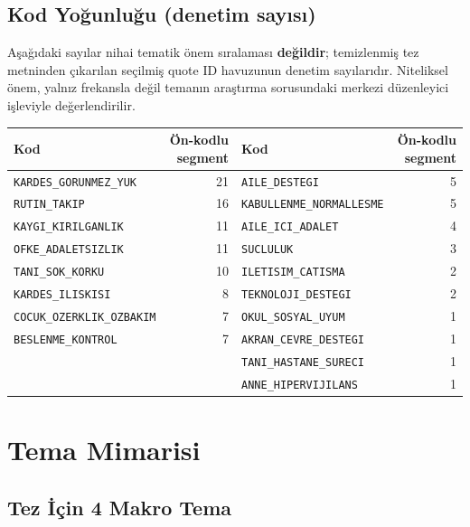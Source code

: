 \documentclass[
  turkish,
  a4paper,
  DIV=11,
  numbers=noendperiod]{scrreprt}
\newcounter{none} %
\begin{document}
\section{Kod Yoğunluğu (denetim
sayısı)}\label{kod-youx11funluux11fu-denetim-sayux131sux131}

Aşağıdaki sayılar nihai tematik önem sıralaması \textbf{değildir};
temizlenmiş tez metninden çıkarılan seçilmiş quote ID havuzunun denetim
sayılarıdır. Niteliksel önem, yalnız frekansla değil temanın araştırma
sorusundaki merkezi düzenleyici işleviyle değerlendirilir.

{\def\LTcaptype{none} %
\begin{longtable}[]{@{}lrlr@{}}
\toprule\noalign{}
Kod & Ön-kodlu segment & Kod & Ön-kodlu segment \\
\midrule\noalign{}
\endhead
\bottomrule\noalign{}
\endlastfoot
\texttt{KARDES\_GORUNMEZ\_YUK} & 21 & \texttt{AILE\_DESTEGI} & 5 \\
\texttt{RUTIN\_TAKIP} & 16 & \texttt{KABULLENME\_NORMALLESME} & 5 \\
\texttt{KAYGI\_KIRILGANLIK} & 11 & \texttt{AILE\_ICI\_ADALET} & 4 \\
\texttt{OFKE\_ADALETSIZLIK} & 11 & \texttt{SUCLULUK} & 3 \\
\texttt{TANI\_SOK\_KORKU} & 10 & \texttt{ILETISIM\_CATISMA} & 2 \\
\texttt{KARDES\_ILISKISI} & 8 & \texttt{TEKNOLOJI\_DESTEGI} & 2 \\
\texttt{COCUK\_OZERKLIK\_OZBAKIM} & 7 & \texttt{OKUL\_SOSYAL\_UYUM} &
1 \\
\texttt{BESLENME\_KONTROL} & 7 & \texttt{AKRAN\_CEVRE\_DESTEGI} & 1 \\
& & \texttt{TANI\_HASTANE\_SURECI} & 1 \\
& & \texttt{ANNE\_HIPERVIJILANS} & 1 \\
\end{longtable}
}

\chapter{Tema Mimarisi}\label{sec-tema-mimarisi}

\section{Tez İçin 4 Makro Tema}\label{tez-iuxe7in-4-makro-tema}
\end{document}
